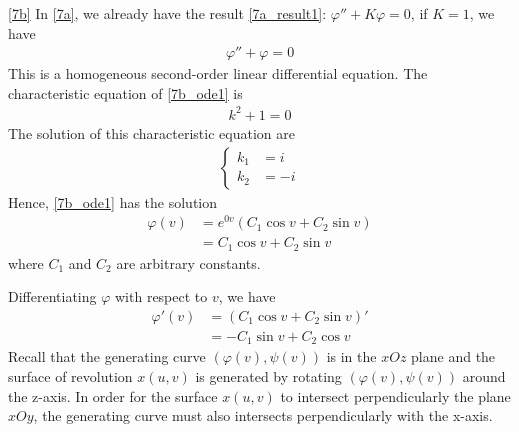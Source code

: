 \documentclass[a4paper]{report}
\begin{document}
\newpage
\ref{7b} In \ref{7a}, we already have the result \eqref{7a_result1}: $\varphi'' + K\varphi = 0$, if $K = 1$, we have
\begin{align}
	\varphi'' + \varphi = 0 \label{7b_ode1}
\end{align}
This is a homogeneous second-order linear differential equation. The characteristic equation of \eqref{7b_ode1} is
\begin{align}
	k^2 + 1 = 0 
\end{align}
The solution of this characteristic equation are
\begin{align}
\begin{cases}
k_1 &= i\\
k_2 &= -i
\end{cases}
\end{align} 
Hence, \eqref{7b_ode1} has the solution
\begin{align}
	\varphi(v) &= e^{0v}\left(C_1 \cos v + C_2 \sin v\right)\\
	&= C_1 \cos v + C_2 \sin v \label{7b_phi}
\end{align}
where $C_1$ and $C_2$ are arbitrary constants.

Differentiating $\varphi$ with respect to $v$, we have
\begin{align}
	\varphi'(v) &= \left(C_1 \cos v + C_2 \sin v\right)'\\
	&= - C_1 \sin v + C_2 \cos v \label{7b_phi1}
\end{align}
Recall that the generating curve $(\varphi(v), \psi(v))$ is in the $xOz$ plane and the surface of revolution $x(u,v)$ is generated by rotating $(\varphi(v), \psi(v))$ around the z-axis. In order for the surface $x(u,v)$ to intersect perpendicularly the plane $xOy$, the generating curve must also intersects perpendicularly with the x-axis.
\end{document}
